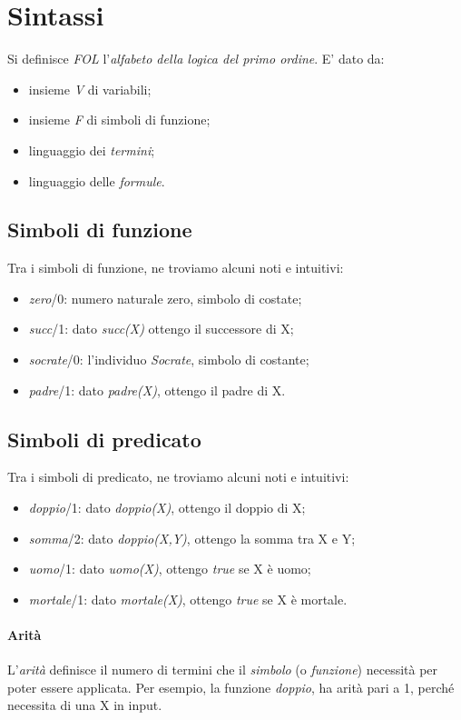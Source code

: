 \section{Sintassi}
Si definisce \textit{FOL} l'\textit{alfabeto della logica del primo ordine}. E' dato da:
\begin{itemize}
	\item insieme \textit{V} di variabili;
	\item insieme \textit{F} di simboli di funzione;
	\item linguaggio dei \textit{termini};
	\item linguaggio delle \textit{formule}.
\end{itemize}
\subsection{Simboli di funzione}
Tra i simboli di funzione, ne troviamo alcuni noti e intuitivi:
\begin{itemize}
	\item \textit{zero}/0: numero naturale zero, simbolo di costate;
	\item \textit{succ}/1: dato \textit{succ(X)} ottengo il successore di X;
	\item \textit{socrate}/0: l'individuo \textit{Socrate}, simbolo di costante;
	\item \textit{padre}/1: dato \textit{padre(X)}, ottengo il padre di X.
\end{itemize}
\subsection{Simboli di predicato}
Tra i simboli di predicato, ne troviamo alcuni noti e intuitivi:
\begin{itemize}
	\item \textit{doppio}/1: dato \textit{doppio(X)}, ottengo il doppio di X;
	\item \textit{somma}/2: dato \textit{doppio(X,Y)}, ottengo la somma tra X e Y;
	\item \textit{uomo}/1: dato \textit{uomo(X)}, ottengo \textit{true} se X è uomo;
	\item \textit{mortale}/1: dato \textit{mortale(X)}, ottengo \textit{true} se X è mortale.
\end{itemize}
\paragraph{Arità}
L'\textit{arità} definisce il numero di termini che il \textit{simbolo} (o \textit{funzione}) necessità per poter essere applicata. Per esempio, la funzione \textit{doppio}, ha arità pari a 1, perché necessita di una X in input.


